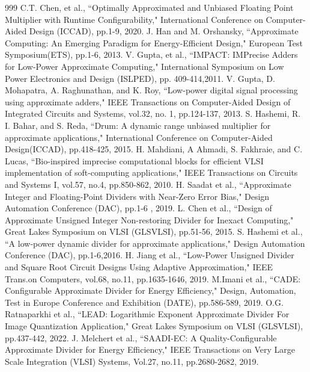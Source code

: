 \documentclass[conference]{IEEEtran}
\begin{document}
\begin{thebibliography}{999}
 C.T. Chen, et al., ``Optimally Approximated and Unbiased Floating Point Multiplier with Runtime Configurability,"  International Conference on Computer-Aided Design (ICCAD), pp.1-9, 2020.
 J. Han and M. Orshansky, ``Approximate Computing: An Emerging Paradigm for Energy-Efficient Design," European Test Symposium(ETS), pp.1-6, 2013.
 V. Gupta, et al., ``IMPACT: IMPrecise Adders for Low-Power Approximate Computing," International Symposium on Low Power Electronics and Design (ISLPED), pp. 409-414,2011.
 V. Gupta, D. Mohapatra, A. Raghunathan, and K. Roy, ``Low-power digital signal processing using approximate adders," IEEE Transactions on Computer-Aided Design of Integrated Circuits and Systems, vol.32, no. 1, pp.124-137, 2013.
S. Hashemi, R. I. Bahar, and S. Reda, ``Drum: A dynamic range unbiased multiplier for approximate applications," International Conference on Computer-Aided Design(ICCAD), pp.418-425, 2015.
H. Mahdiani, A Ahmadi, S. Fakhraie, and C. Lucas, ``Bio-inspired imprecise computational blocks for efficient VLSI implementation of soft-computing applications," IEEE Transactions on Circuits and Systems I, vol.57, no.4, pp.850-862, 2010.
 H. Saadat et al., ``Approximate Integer and Floating-Point Dividers with Near-Zero Error Bias," Design Automation Conference (DAC), pp.1-6 , 2019.
L. Chen et al., ``Design of Approximate Unsigned Integer Non-restoring Divider for Inexact Computing,"  Great Lakes Symposium on VLSI (GLSVLSI), pp.51-56, 2015.
 S. Hashemi et al., ``A low-power dynamic divider for approximate applications," Design Automation Conference (DAC), pp.1-6,2016.
 H. Jiang et al., ``Low-Power Unsigned Divider and Square Root Circuit Designs Using Adaptive Approximation," IEEE Trans.on Computers, vol.68, no.11, pp.1635-1646, 2019.
M.Imani et al., ``CADE: Configurable Approximate Divider for Energy Efficiency," Design, Automation, Test in Europe Conference and Exhibition (DATE), pp.586-589, 2019.
O.G. Ratnaparkhi et al., ``LEAD: Logarithmic Exponent Approximate Divider For Image Quantization Application,"	Great Lakes Symposium on VLSI (GLSVLSI), pp.437-442, 2022.
J. Melchert et al., ``SAADI-EC: A Quality-Configurable Approximate Divider for Energy Efficiency,"	IEEE Transactions on Very Large Scale Integration (VLSI) Systems, Vol.27, no.11, pp.2680-2682, 2019.

\end{thebibliography}
\end{document}

